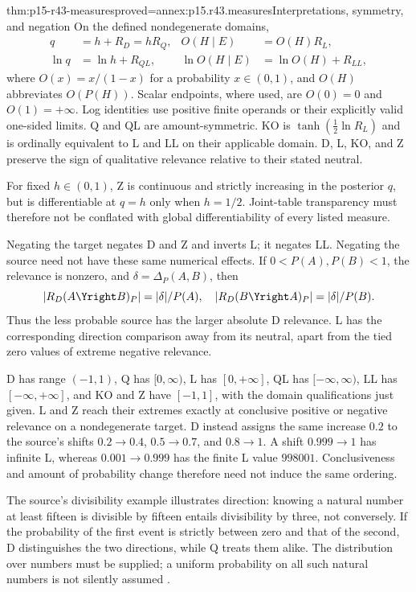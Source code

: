 \begin{hbtheorem}{thm:p15-r43-measures}{proved=annex:p15.r43.measures}{Interpretations, symmetry, and negation}
On the defined nondegenerate domains,
\[
 \begin{aligned}
 q&=h+R_D=hR_Q,& O(H\mid E)&=O(H)R_L,\\
 \ln q&=\ln h+R_{QL},&
 \ln O(H\mid E)&=\ln O(H)+R_{LL},
 \end{aligned}
\]
where \(O(x)=x/(1-x)\) for a probability \(x\in(0,1)\), and
\(O(H)\) abbreviates \(O(P(H))\). Scalar endpoints, where used, are
\(O(0)=0\) and \(O(1)=+\infty\). Log identities use positive finite operands
or their explicitly valid one-sided limits. Q and QL are amount-symmetric.
KO is \(\tanh(\tfrac12\ln R_L)\) and is ordinally equivalent to L
and LL on their applicable domain. D, L, KO, and Z preserve the sign
of qualitative relevance relative to their stated neutral.

For fixed \(h\in(0,1)\), Z is continuous and strictly increasing
in the posterior \(q\), but is differentiable at \(q=h\) only when
\(h=1/2\). Joint-table transparency must therefore not be conflated
with global differentiability of every listed measure.

Negating the target negates D and Z and inverts L; it negates LL.
Negating the source need not have these same numerical effects. If
\(0<P(A),P(B)<1\), the relevance is nonzero, and
\(\delta=\Delta_P(A,B)\), then
\[
 |R_D(A\Yright B)_P|=|\delta|/P(A),
 \quad |R_D(B\Yright A)_P|=|\delta|/P(B).
\]
Thus the less probable source has the larger absolute D relevance.
L has the corresponding direction comparison away from its neutral,
apart from the tied zero values of extreme negative relevance.
\end{hbtheorem}

D has range \((-1,1)\), Q has \([0,\infty)\), L has
\([0,+\infty]\), QL has \([-\infty,\infty)\), LL has
\([-\infty,+\infty]\), and KO and Z have \([-1,1]\), with the
domain qualifications just given. L and Z reach their extremes exactly
at conclusive positive or negative relevance on a nondegenerate target.
D instead assigns the same increase \(0.2\) to the source's shifts
\(0.2\to0.4\), \(0.5\to0.7\), and \(0.8\to1\). A shift
\(0.999\to1\) has infinite L, whereas \(0.001\to0.999\) has the
finite L value \(998001\). Conclusiveness and amount of probability
change therefore need not induce the same ordering.

The source's divisibility example illustrates direction: knowing a
natural number at least fifteen is divisible by fifteen entails
divisibility by three, not conversely. If the probability of the first
event is strictly between zero and that of the second, D distinguishes
the two directions, while Q treats them alike. The distribution over
numbers must be supplied; a uniform probability on all such natural
numbers is not silently assumed
\parencite[pp.~269--272 and p.~274, nn.~7, 10, 17]{Merin2021Relevance}.

